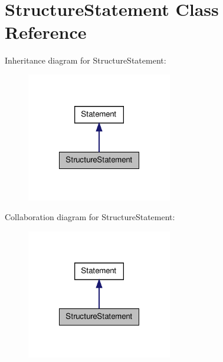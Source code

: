 \hypertarget{class_structure_statement}{\section{Structure\-Statement Class Reference}
\label{class_structure_statement}
}


Inheritance diagram for Structure\-Statement\-:
\nopagebreak
\begin{figure}[H]
\begin{center}
\leavevmode
\includegraphics[width=180pt]{class_structure_statement__inherit__graph}
\end{center}
\end{figure}


Collaboration diagram for Structure\-Statement\-:
\nopagebreak
\begin{figure}[H]
\begin{center}
\leavevmode
\includegraphics[width=180pt]{class_structure_statement__coll__graph}
\end{center}
\end{figure}
